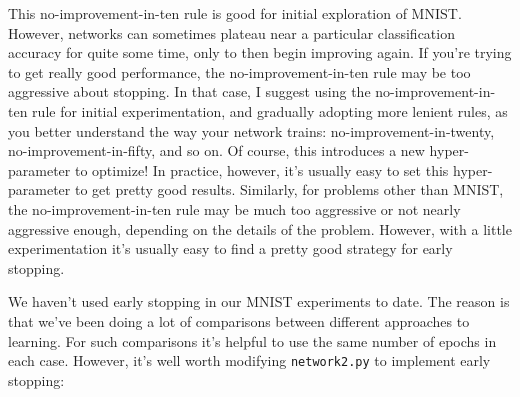 This no-improvement-in-ten rule is good for initial exploration of MNIST. However, networks can sometimes plateau near a particular classification accuracy for quite some time, only to then begin improving again. If you're trying to get really good performance, the no-improvement-in-ten rule may be too aggressive about stopping. In that case, I suggest using the no-improvement-in-ten rule for initial experimentation, and gradually adopting more lenient rules, as you better understand the way your network trains: no-improvement-in-twenty, no-improvement-in-fifty, and so on. Of course, this introduces a new hyper-parameter to optimize! In practice, however, it's usually easy to set this hyper-parameter to get pretty good results. Similarly, for problems other than MNIST, the no-improvement-in-ten rule may be much too aggressive or not nearly aggressive enough, depending on the details of the problem. However, with a little experimentation it's usually easy to find a pretty good strategy for early stopping.


We haven't used early stopping in our MNIST experiments to date. The reason is that we've been doing a lot of comparisons between different approaches to learning. For such comparisons it's helpful to use the same number of epochs in each case. However, it's well worth modifying \texttt{network2.py} to implement early stopping:



